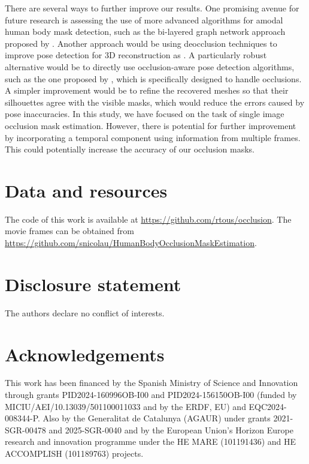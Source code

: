 \documentclass[11pt,a4paper]{article}
\begin{document}
There are several ways to further improve our results. One promising avenue for future research is assessing the use of more advanced algorithms for amodal human body mask detection, such as the bi-layered graph network approach proposed by \citep{BiLayers}. Another approach would be using deocclusion techniques to improve pose detection for 3D reconstruction as \citep{sym14030531}. A particularly robust alternative would be to directly use occlusion-aware pose detection algorithms, such as the one proposed by \citep{OccShapePose}, which is specifically designed to handle occlusions. A simpler improvement would be to refine the recovered meshes so that their silhouettes agree with the visible masks, which would reduce the errors caused by pose inaccuracies. In this study, we have focused on the task of single image occlusion mask estimation. However, there is potential for further improvement by incorporating a temporal component using information from multiple frames. This could potentially increase the accuracy of our occlusion masks.

\section*{Data and resources}
The code of this work is available at \url{https://github.com/rtous/occlusion}. The movie frames can be obtained from \url{https://github.com/snicolau/HumanBodyOcclusionMaskEstimation}.

\section*{Disclosure statement}
The authors declare no conflict of interests.

\section*{Acknowledgements}
This work has been financed by the Spanish Ministry of Science and Innovation through grants PID2024-160996OB-I00 and PID2024-156150OB-I00 (funded by MICIU/AEI/10.13039/501100011033 and by the ERDF, EU) and EQC2024-008344-P. Also by the Generalitat de Catalunya (AGAUR) under grants 2021-SGR-00478 and 2025-SGR-0040 and by the European Union's Horizon Europe research and innovation programme under the HE MARE (101191436) and HE ACCOMPLISH (101189763) projects.



\end{document}

